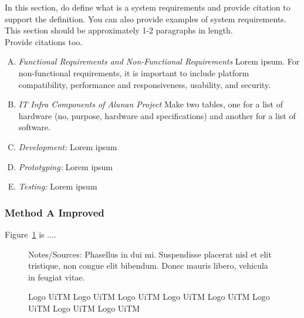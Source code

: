 In this section, do define what is a system requirements and provide citation to support the definition. You can also provide examples of system requirements. This section should be approximately 1-2 paragraphs in length. \\

Provide citations too.

\begin{enumerate}[A.]
    \item \textit{Functional Requirements and Non-Functional Requirements} Lorem ipsum. For non-functional requirements, it is important to include platform compatibility, performance and responsiveness, usability, and security.
    \item \textit{IT Infra Components of Alunan Project} Make two tables, one for a list of hardware (no, purpose, hardware and specifications) and another for a list of software.
    \item \textit{Development:} Lorem ipsum
    \item \textit{Prototyping:} Lorem ipsum
    \item \textit{Testing:} Lorem ipsum
\end{enumerate}

\subsubsection{Method A Improved}

Figure~\ref{fig:logouitm} is $\dots$. \lipsum[1-2]

\begin{figure}[ht]
    \centering
    \caption[Short version for LoF]{Logo UiTM Logo UiTM Logo UiTM Logo UiTM Logo UiTM Logo UiTM Logo UiTM Logo UiTM}
    \label{fig:logouitm}

    \par\raggedright
    Notes/Sources: Phasellus in dui mi. Suspendisse placerat nisl et elit tristique, non congue elit bibendum. Donec mauris libero, vehicula in feugiat vitae.
\end{figure}

\lipsum[2-3]

